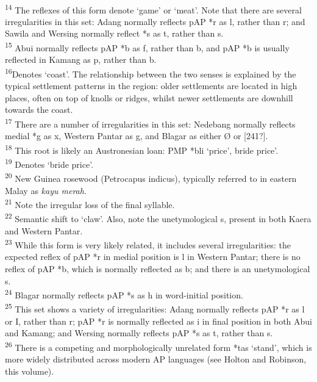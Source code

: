 \documentclass[output=paper]{LSP/langsci}
\begin{document}
 \\
\textsuperscript{14} The reflexes of this form denote `game' or `meat'. Note that there are several irregularities in this set: Adang normally reflects pAP *r as l, rather than r; and Sawila and Wersing normally reflect *s as t, rather than s. 
 \\
\textsuperscript{15} Abui normally reflects pAP *b as f, rather than b, and pAP *b is usually reflected in Kamang as p, rather than b. 
 \\
\textsuperscript{16}Denotes `coast'. The relationship between the two senses is explained by the typical settlement patterns in the region: older settlements are located in high places, often on top of knolls or ridges, whilst newer settlements are downhill towards the coast.
 \\
\textsuperscript{17} There are a number of irregularities in this set: Nedebang normally reflects medial *g as x, Western Pantar as g{\textlengthmark}, and Blagar as either {\O} or [241?].
\\
\textsuperscript{18} This root is likely an Austronesian loan: PMP *b{\textschwa}li `price', bride price'. 
\\
\textsuperscript{19} Denotes `bride price'. 
\\
\textsuperscript{20} New Guinea rosewood (Petrocapus indicus), typically referred to in eastern Malay as \textit{kayu merah}. 
\\
\textsuperscript{21} Note the irregular loss of the final syllable. 
\\
\textsuperscript{22} Semantic shift to `claw'. Also, note the unetymological s, present in both Kaera and Western Pantar. 
\\
\textsuperscript{23} While this form is very likely related, it includes several irregularities: the expected reflex of pAP *r in medial position is l in Western Pantar; there is no reflex of pAP *b, which is normally reflected as b; and there is an unetymological s. 
\\
\textsuperscript{24} Blagar normally reflects pAP *s as h in word-initial position. 
\\
\textsuperscript{25} This set shows a variety of irregularities: Adang normally reflects pAP *r as l or I, rather than r; pAP *r is normally reflected as i in final position in both Abui and Kamang; and Wersing normally reflects pAP *s as t, rather than s.
\\
\textsuperscript{26} There is a competing and morphologically unrelated form *tas `stand', which is more widely distributed across modern AP languages (see Holton and Robinson, this volume). 
\end{document}
